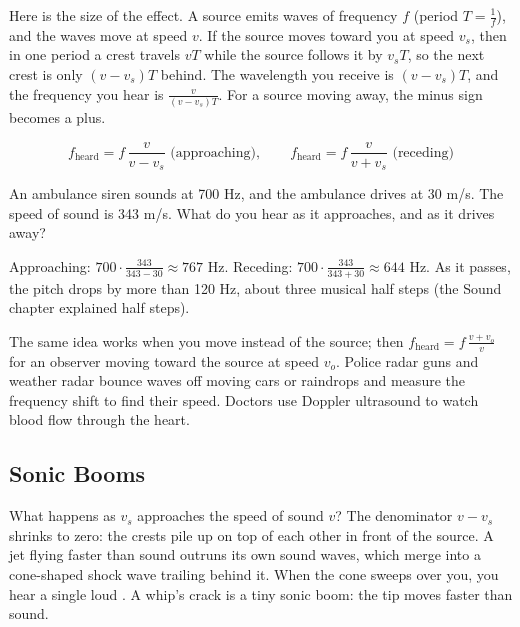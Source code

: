 Here is the size of the effect. A source emits waves of frequency $f$ (period $T = \frac{1}{f}$), and the waves move
at speed $v$. If the source moves toward you at speed $v_s$, then in one period a crest travels $vT$ while the source
follows it by $v_sT$, so the next crest is only $(v - v_s)T$ behind. The wavelength you receive is $(v - v_s)T$, and the
frequency you hear is $\frac{v}{(v - v_s)T}$. For a source moving away, the minus sign becomes a plus.

\begin{mdframed}[style = important, frametitle = {The Doppler Effect for a Moving Source}]
$$f_{\text{heard}} = f\,\frac{v}{v - v_s} \text{ (approaching)}, \qquad f_{\text{heard}} = f\,\frac{v}{v + v_s} \text{ (receding)}$$
\end{mdframed}

\begin{Worked}
\begin{Problem}
An ambulance siren sounds at 700 Hz, and the ambulance drives at 30 m/s. The speed of sound is
343 m/s. What do you hear as it approaches, and as it drives away?
\end{Problem}
\begin{Solution}
Approaching: $700 \cdot \frac{343}{343 - 30} \approx 767$ Hz. Receding:
$700 \cdot \frac{343}{343 + 30} \approx 644$ Hz. As it passes, the pitch drops by more than 120 Hz, about three
musical half steps (the Sound chapter explained half steps).
\end{Solution}
\end{Worked}

The same idea works when you move instead of the source; then $f_{\text{heard}} = f\,\frac{v + v_o}{v}$ for an observer
moving toward the source at speed $v_o$. Police radar guns and weather radar bounce waves off moving cars or raindrops
and measure the frequency shift to find their speed. Doctors use Doppler ultrasound to watch blood flow through the heart.

\subsection{Sonic Booms}
What happens as $v_s$ approaches the speed of sound $v$? The denominator $v - v_s$ shrinks to zero: the crests pile up on
top of each other in front of the source. A jet flying faster than sound outruns its own sound waves, which merge into a
cone-shaped shock wave trailing behind it. When the cone sweeps over you, you hear a single loud .
A whip's crack is a tiny sonic boom: the tip moves faster than sound.

